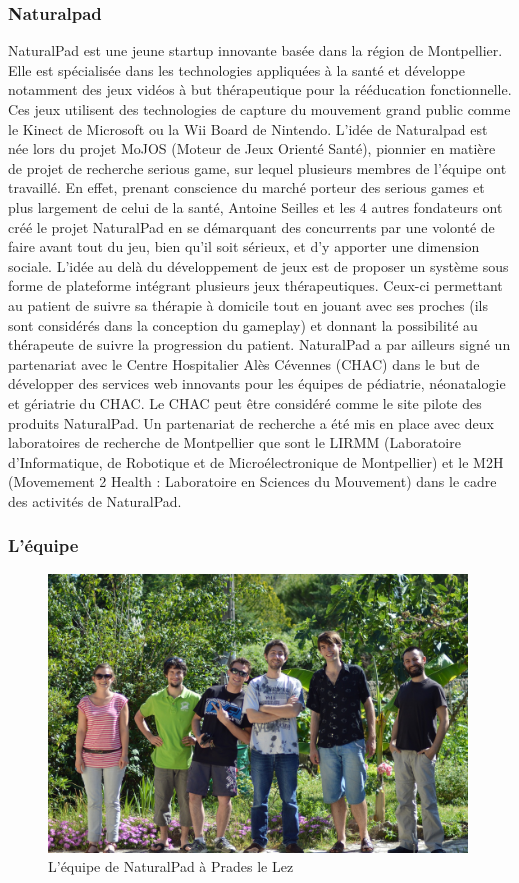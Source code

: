 	\subsubsection{Naturalpad}
NaturalPad est une jeune startup innovante basée dans la région de Montpellier. Elle est spécialisée dans les technologies appliquées à la santé et développe notamment des jeux vidéos à but thérapeutique pour la rééducation fonctionnelle. Ces jeux utilisent des technologies de capture du mouvement grand public comme le Kinect de Microsoft ou la Wii Board de Nintendo. L’idée de Naturalpad est née lors du projet MoJOS (Moteur de Jeux Orienté Santé), pionnier en matière de projet de recherche serious game, sur lequel plusieurs membres de l’équipe ont travaillé. En effet, prenant conscience du marché porteur des serious games et plus largement de celui de la santé, Antoine Seilles et les 4 autres fondateurs ont créé le projet NaturalPad en se démarquant des concurrents par une volonté de faire avant tout du jeu, bien qu’il soit sérieux, et d’y apporter une dimension sociale. L’idée au delà du développement de jeux est de proposer un système sous forme de plateforme intégrant plusieurs jeux thérapeutiques. Ceux-ci permettant au patient de suivre sa thérapie à domicile tout en jouant avec ses proches (ils sont considérés dans la conception du gameplay) et donnant la possibilité au thérapeute de suivre la progression du patient. NaturalPad a par ailleurs signé un partenariat avec le Centre Hospitalier Alès Cévennes (CHAC) dans le but de développer des services web innovants pour les équipes de pédiatrie, néonatalogie et gériatrie du CHAC. Le CHAC peut être considéré comme le site pilote des produits NaturalPad. Un partenariat de recherche a été mis en place avec deux laboratoires de recherche de Montpellier que sont le LIRMM (Laboratoire d’Informatique, de Robotique et de Microélectronique de Montpellier) et le M2H (Movemement 2 Health : Laboratoire en Sciences du Mouvement) dans le cadre des activités de NaturalPad.

	\subsubsection{L'équipe}
	\begin{figure}[!h]
		\centering
		\includegraphics[width=420px]{images/naturalpad_groupe.jpg}
		\caption{L'équipe de NaturalPad à Prades le Lez}
		\label{naturalpad_groupe}
	\end{figure}
